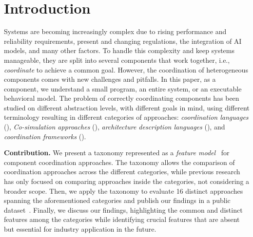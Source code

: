 \documentclass[runningheads]{llncs}
\begin{document}
\section{Introduction} \label{sec: introduction}
Systems are becoming increasingly complex due to rising performance and reliability requirements, present and changing regulations, the integration of AI models, and many other factors.
To handle this complexity and keep systems manageable, they are split into several components that work together, i.e., \textit{coordinate} to achieve a common goal.
However, the coordination of heterogeneous components comes with new challenges and pitfalls.
In this paper, as a component, we understand a small program, an entire system, or an executable behavioral model.
The problem of correctly coordinating components has been studied on different abstraction levels, with different goals in mind, using different terminology resulting in different categories of approaches: \textit{coordination languages} (\cite{papadopoulosCoordinationModelsLanguages1998}), \textit{Co-simulation approaches} (\cite{gomesCoSimulationSurvey2019}), \textit{architecture description languages} (\cite{clementsSurveyArchitectureDescription1996}), and \textit{coordination frameworks} (\cite{krauterBehavioralConsistencyMultimodeling2023,varalarsenBehavioralCoordinationOperator2015}).

\textbf{Contribution.} We present a taxonomy represented as a \textit{feature model}~\cite{kangFeatureOrientedDomainAnalysis1990} for component coordination approaches. 
The taxonomy allows the comparison of coordination approaches across the different categories, while previous research has only focused on comparing approaches inside the categories, not considering a broader scope. 
Then, we apply the taxonomy to evaluate 16 distinct approaches spanning the aforementioned categories and publish our findings in a public dataset~\cite{timkrauterArtifactsCoordination2024}.
Finally, we discuss our findings, highlighting the common and distinct features among the categories while identifying crucial features that are absent but essential for industry application in the future.

\end{document}
